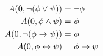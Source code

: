   $\begin{aligned}
    A(0, \lnot (\phi \lor \psi)) =&\ \lnot \phi\\ 
    A(0, \phi \land \psi) =&\ \phi\\ 
    A(0, \lnot (\phi \to \psi)) =&\ \phi\\ 
    A(0, \phi \leftrightarrow \psi) =&\ \phi \to \psi
  \end{aligned}$